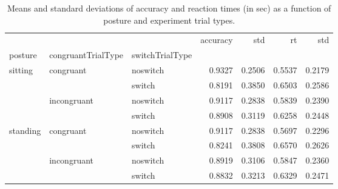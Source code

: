 \begin{table}
\centering
\caption{Means and standard deviations of accuracy and reaction times (in sec) as a function of posture and experiment trial types.}
\label{table-task-switching-replication-reaction-time}
\begin{tabular}{lllrrrr}
\toprule
         &             &        & accuracy &    std &     rt &    std \\
posture & congruantTrialType & switchTrialType &          &        &        &        \\
\midrule
sitting & congruant & noswitch &   0.9327 & 0.2506 & 0.5537 & 0.2179 \\
         &             & switch &   0.8191 & 0.3850 & 0.6503 & 0.2586 \\
         & incongruant & noswitch &   0.9117 & 0.2838 & 0.5839 & 0.2390 \\
         &             & switch &   0.8908 & 0.3119 & 0.6258 & 0.2448 \\
standing & congruant & noswitch &   0.9117 & 0.2838 & 0.5697 & 0.2296 \\
         &             & switch &   0.8241 & 0.3808 & 0.6570 & 0.2626 \\
         & incongruant & noswitch &   0.8919 & 0.3106 & 0.5847 & 0.2360 \\
         &             & switch &   0.8832 & 0.3213 & 0.6329 & 0.2471 \\
\bottomrule
\end{tabular}
\end{table}
